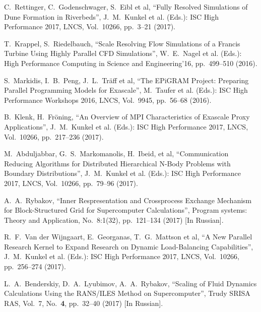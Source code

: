\documentclass[
11pt,%
tightenlines,%
twoside,%
onecolumn,%
nofloats,%
nobibnotes,%
nofootinbib,%
superscriptaddress,%
noshowpacs,%
centertags]%
{revtex4}
\begin{document}
\begin{thebibliography}{99}


C.~Rettinger, C.~Godenschwager, S.~Eibl et al, \textquotedblleft Fully Resolved Simulations of Dune Formation in Riverbeds\textquotedblright, J.~M.~Kunkel et al. (Eds.): ISC High Performance 2017, LNCS, Vol.~10266, pp.~3--21 (2017).

T.~Krappel, S.~Riedelbauch, \textquotedblleft Scale Resolving Flow Simulations of a Francis Turbine Using Highly Parallel CFD Simulations\textquotedblright, W.~E.~Nagel et al. (Eds.): High Performance Computing in Science and Engineering'16, pp.~499--510 (2016).

S.~Markidis, I.~B.~Peng, J.~L.~Tr\"aff et al, \textquotedblleft The EPiGRAM Project: Preparing Parallel Programming Models for Exascale\textquotedblright, M.~Taufer et al. (Eds.): ISC High Performance Workshops 2016, LNCS, Vol.~9945, pp.~56--68 (2016).

B.~Klenk, H.~Fr\"oning, \textquotedblleft An Overview of MPI Characteristics of Exascale Proxy Applications\textquotedblright, J.~M.~Kunkel et al. (Eds.): ISC High Performance 2017, LNCS, Vol.~10266, pp.~217--236 (2017).

M.~Abduljabbar, G.~S.~Markomanolis, H.~Ibeid, et al, \textquotedblleft Communication Reducing Algorithms for Distributed Hierarchical N-Body Problems with Boundary Distributions\textquotedblright, J.~M.~Kunkel et al. (Eds.): ISC High Performance 2017, LNCS, Vol.~10266, pp.~79--96 (2017).

A.~A.~Rybakov, \textquotedblleft Inner Respresentation and Crossprocess Exchange Mechanism for Block-Structured Grid for Supercomputer Calculations\textquotedblright, Program systems: Theory and Application, No.~8:1(32), pp.~121--134 (2017) [In Russian].

R.~F.~Van der Wijngaart, E.~Georganas, T.~G.~Mattson et al, \textquotedblleft A New Parallel Research Kernel to Expand Research on Dynamic Load-Balancing Capabilities\textquotedblright, J.~M.~Kunkel et al. (Eds.): ISC High Performance 2017, LNCS, Vol.~10266, pp.~256--274 (2017).

L.~A.~Benderskiy, D.~A.~Lyubimov, A.~A.~Rybakov, \textquotedblleft Scaling of Fluid Dynamics Calculations Using the RANS/ILES Method on Supercomputer\textquotedblright, Trudy SRISA RAS, Vol.~7, No.~\textbf{4}, pp.~32--40 (2017) [In Russian].


\end{thebibliography}
\end{document}
